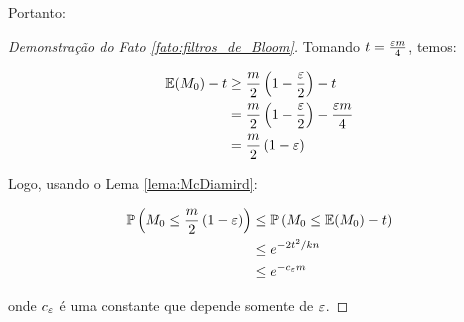 Portanto:

\begin{proof}[Demonstração do Fato \ref{fato:filtros_de_Bloom}]
Tomando $t = \frac{\varepsilon m}{4}$, temos:

\begin{align*}
  \mathbb{E}(M_{0}) - t &\geq \frac{m}{2}\left(1-\frac{\varepsilon}{2}\right) - t\\
                        &= \frac{m}{2}\left(1-\frac{\varepsilon}{2}\right) - \frac{\varepsilon m}{4}\\
                        &= \frac{m}{2}\left(1-\varepsilon\right)
\end{align*}

Logo, usando o Lema \ref{lema:McDiamird}:

\begin{align*}
  \mathbb{P}\left(M_{0}\leq \frac{m}{2}\left(1-\varepsilon\right)\right) &\leq \mathbb{P}\left(M_{0}\leq \mathbb{E}(M_{0})-t\right)\\
                                                                  &\leq e^{-2t^2/kn}\\
                                                                  &\leq e^{-c_{\varepsilon}m}
\end{align*}

onde $c_{\varepsilon}$ é uma constante que depende somente de $\varepsilon$.

\end{proof}
